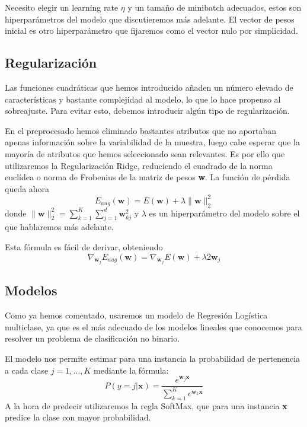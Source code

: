 \documentclass[a4]{article}
\begin{document}
Necesito elegir un learning rate $\eta$ y un tamaño de minibatch
adecuados, estos son hiperparámetros del modelo que discutieremos más
adelante. El vector de pesos inicial es otro hiperparámetro que
fijaremos como el vector nulo por simplicidad.

\subsection{Regularización}

Las funciones cuadráticas que hemos introducido añaden un número
elevado de características y bastante complejidad al modelo, lo que lo
hace propenso al sobreajuste. Para evitar esto, debemos introducir
algún tipo de regularización.

En el preprocesado hemos eliminado bastantes atributos que no
aportaban apenas información sobre la variabilidad de la muestra,
luego cabe esperar que la mayoría de atributos que hemos seleccionado
sean relevantes. Es por ello que utilizaremos la Regularización Ridge,
reduciendo el cuadrado de la norma euclídea o norma de Frobenius de la
matriz de pesos \textbf{w}. La función de pérdida queda ahora
\vspace{-2mm}
\[E_{aug}(\textbf{w})=E(\textbf{w})+\lambda
  \|\textbf{w}\|_2^2\]\vspace{-2mm} donde
$\|\textbf{w}\|_2^2=\sum\limits_{k=1}^K\sum\limits_{j=1}^d
\textbf{w}_{kj}^2$ y $\lambda$ es un hiperparámetro del modelo sobre
el que hablaremos más adelante.

Esta fórmula es fácil de derivar, obteniendo \vspace{-2mm}
\[\nabla_{\textbf{w}_j}E_{aug}(\textbf{w})=\nabla_{\textbf{w}_j}E(\textbf{w})+\lambda 2\textbf{w}_j\]

\subsection{Modelos}

Como ya hemos comentado, usaremos un modelo de Regresión Logística
multiclase, ya que es el más adecuado de los modelos lineales que
conocemos para resolver un problema de clasificación no binario.

El modelo nos permite estimar para una instancia la probabilidad de
pertenencia a cada clase $j=1,\ldots,K$ mediante la fórmula:
\[P(y=j|\textbf{x})=\frac{e^{\textbf{w}_j \textbf{x}}}{\sum_{k=1}^K
    e^{\textbf{w}_k \textbf{x}}}\] A la hora de predecir utilizaremos
la regla SoftMax, que para una instancia \textbf{x} predice la
clase con mayor probabilidad.
\end{document}

